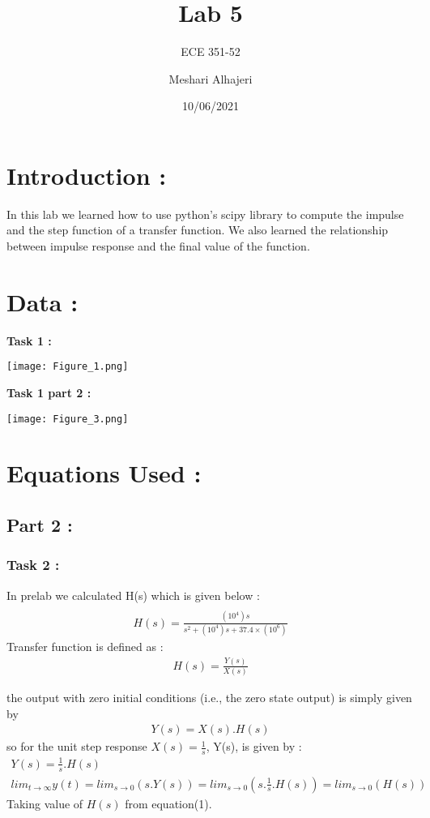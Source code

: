 \documentclass[11pt]{article}
\title{Lab 5}
\author{ECE 351-52}
\author{Meshari Alhajeri}
\date{10/06/2021}
\begin{document}
\maketitle
\section{Introduction :}
In this lab we learned how to use python's scipy library to compute the impulse and the step function of a transfer function. We also learned the relationship between impulse response and the final value of the function. 

\section{Data :}


\textbf{Task 1 :}
\begin{center}
\texttt{[image: Figure\_1.png]}
\end{center}

\textbf{Task 1 part 2 :}
\begin{center}
\texttt{[image: Figure\_3.png]}
\end{center}
\section{Equations Used :}\label{section-introduction}
\subsection{Part 2 :}
\subsubsection{Task 2 :}
In prelab we calculated H(s) which is given below : 
\begin{align}
\\H(s) =\frac{(10^4)s}{s^2 +{(10^{4})s}+{37.4\times(10^{6})}}
\end{align}
Transfer function is defined as :
\begin{align*}
H(s)=\frac{Y(s)}{X(s)}
\end{align*}

the output with zero initial conditions (i.e., the zero state output) is simply given by
\begin{align*}Y(s)=X(s).H(s)\end{align*}
so for the unit step response $X(s) = \frac{1}{s}$, Y(s), is given by :
\begin{align*}Y(s)=\frac{1}{s}.H(s)
\\lim_{t \to \infty}y(t)=lim_{s\to0}(s.Y(s))=lim_{s\to0}(s.\frac{1}{s}.H(s))=lim_{s\to 0}(H(s))
\end{align*}
Taking value of $H(s)$ from equation(1).
\end{document}
